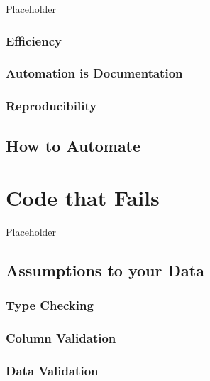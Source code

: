 \documentclass[]{book}
\begin{document}
Placeholder

\hypertarget{efficiency}{%
\subsection{Efficiency}\label{efficiency}}

\hypertarget{automation-is-documentation}{%
\subsection{Automation is Documentation}\label{automation-is-documentation}}

\hypertarget{reproducibility}{%
\subsection{Reproducibility}\label{reproducibility}}

\hypertarget{how-to-automate}{%
\section{How to Automate}\label{how-to-automate}}

\hypertarget{code-that-fails}{%
\chapter{Code that Fails}\label{code-that-fails}}

Placeholder

\hypertarget{assumptions-to-your-data}{%
\section{Assumptions to your Data}\label{assumptions-to-your-data}}

\hypertarget{type-checking}{%
\subsection{Type Checking}\label{type-checking}}

\hypertarget{column-validation}{%
\subsection{Column Validation}\label{column-validation}}

\hypertarget{data-validation}{%
\subsection{Data Validation}\label{data-validation}}
\end{document}
